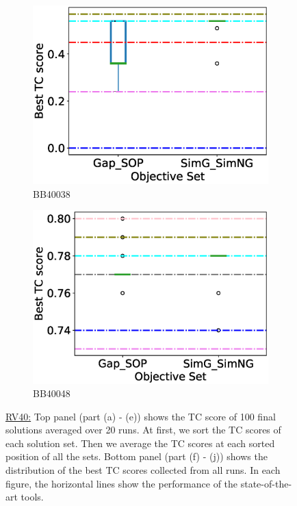 \begin{figure}[!htbp]
\begin{adjustwidth}{-1cm}{-1cm}
\begin{subfigure}{0.22\textwidth}
			\includegraphics[width=\columnwidth]{Figure/summary/precomputedInit/Balibase/BB40038_objset_tc_rank_2}
			\caption{BB40038}
		\end{subfigure}
		\begin{subfigure}{0.22\textwidth}
			\includegraphics[width=\columnwidth]{Figure/summary/precomputedInit/Balibase/BB40048_objset_tc_rank_2}
			\caption{BB40048}
		\end{subfigure}
		\caption{\underline{RV40:} Top panel (part (a) - (e)) shows the TC score of 100 final solutions averaged over 20 runs. At first, we sort the TC scores of each solution set. Then we average the TC scores at each sorted position of all the sets. Bottom panel (part (f) - (j)) shows the distribution of the best TC scores collected from all runs. In each figure, the horizontal lines show the performance of the state-of-the-art tools.}
		\label{fig:rv40_tc}
	\end{adjustwidth}
\end{figure}


